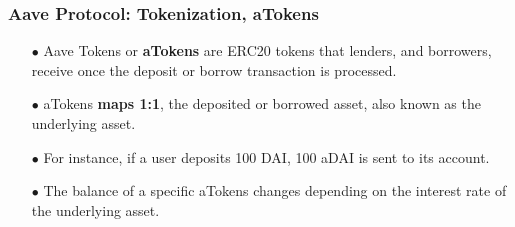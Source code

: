\documentclass{beamer}
\begin{document}
\begin{frame}	
	\frametitle{Aave Protocol: Tokenization, aTokens}
	\begin{itemize}
		\item[$\bullet$] Aave Tokens or \textbf{aTokens} are ERC20 tokens that lenders, and borrowers, receive once the deposit or borrow transaction is processed. 
		\item[$\bullet$] aTokens \textbf{maps 1:1}, the deposited or borrowed asset, also known as the underlying asset. 
		\item[$\bullet$] For instance, if a user deposits 100 DAI, 100 aDAI is sent to its account.
		\item[$\bullet$] The balance of a specific aTokens changes depending on the interest rate of the underlying asset.
		
	\end{itemize}
	
\end{frame}
\end{document}

